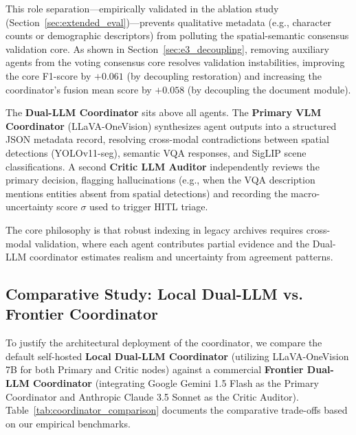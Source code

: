\documentclass[12pt,onecolumn,a4paper]{IEEEtran}
\begin{document}
This role separation—empirically validated in the ablation study (Section~\ref{sec:extended_eval})—prevents qualitative metadata (e.g., character counts or demographic descriptors) from polluting the spatial-semantic consensus validation core. As shown in Section~\ref{sec:e3_decoupling}, removing auxiliary agents from the voting consensus core resolves validation instabilities, improving the core F1-score by $+0.061$ (by decoupling restoration) and increasing the coordinator's fusion mean score by $+0.058$ (by decoupling the document module).

The \textbf{Dual-LLM Coordinator} sits above all agents. The \textbf{Primary VLM Coordinator} (LLaVA-OneVision) synthesizes agent outputs into a structured JSON metadata record, resolving cross-modal contradictions between spatial detections (YOLOv11-seg), semantic VQA responses, and SigLIP scene classifications. A second \textbf{Critic LLM Auditor} independently reviews the primary decision, flagging hallucinations (e.g., when the VQA description mentions entities absent from spatial detections) and recording the macro-uncertainty score $\sigma$ used to trigger HITL triage.

The core philosophy is that robust indexing in legacy archives requires cross-modal validation, where each agent contributes partial evidence and the Dual-LLM coordinator estimates realism and uncertainty from agreement patterns.

\subsection{Comparative Study: Local Dual-LLM vs. Frontier Coordinator}
To justify the architectural deployment of the coordinator, we compare the default self-hosted \textbf{Local Dual-LLM Coordinator} (utilizing LLaVA-OneVision 7B for both Primary and Critic nodes) against a commercial \textbf{Frontier Dual-LLM Coordinator} (integrating Google Gemini 1.5 Flash as the Primary Coordinator and Anthropic Claude 3.5 Sonnet as the Critic Auditor). Table~\ref{tab:coordinator_comparison} documents the comparative trade-offs based on our empirical benchmarks.
\end{document}
